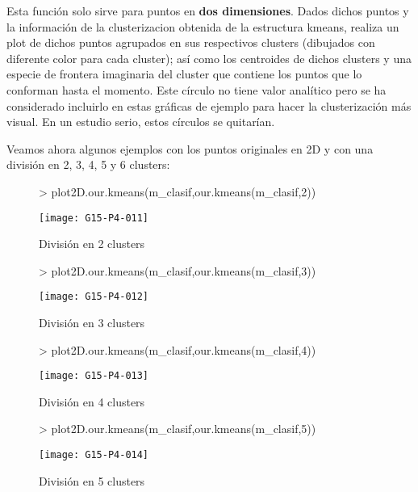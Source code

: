 \documentclass [a4paper] {article}
\begin{document}
Esta función solo sirve para puntos en \textbf{dos dimensiones}. Dados dichos puntos y la información de la clusterizacion obtenida de la estructura kmeans, realiza un plot de dichos puntos agrupados en sus respectivos clusters (dibujados con diferente color para cada cluster); así como los centroides de dichos clusters y una especie de frontera imaginaria del cluster que contiene los puntos que lo conforman hasta el momento. Este círculo no tiene valor analítico pero se ha considerado incluirlo en estas gráficas de ejemplo para hacer la clusterización más visual. En un estudio serio, estos círculos se quitarían.

Veamos ahora algunos ejemplos con los puntos originales en 2D y con una división en 2, 3, 4, 5 y 6 clusters:
\begin{figure}[htbp!]
\centering
\begin{Schunk}
\begin{Sinput}
> plot2D.our.kmeans(m_clasif,our.kmeans(m_clasif,2))
\end{Sinput}
\end{Schunk}
\texttt{[image: G15-P4-011]}
\caption{División en 2 clusters}
\end{figure}

\begin{figure}[htbp!]
\centering
\begin{Schunk}
\begin{Sinput}
> plot2D.our.kmeans(m_clasif,our.kmeans(m_clasif,3))
\end{Sinput}
\end{Schunk}
\texttt{[image: G15-P4-012]}
\caption{División en 3 clusters}
\end{figure}

\begin{figure}[htbp!]
\centering
\begin{Schunk}
\begin{Sinput}
> plot2D.our.kmeans(m_clasif,our.kmeans(m_clasif,4))
\end{Sinput}
\end{Schunk}
\texttt{[image: G15-P4-013]}
\caption{División en 4 clusters}
\end{figure}

\begin{figure}[htbp!]
\centering
\begin{Schunk}
\begin{Sinput}
> plot2D.our.kmeans(m_clasif,our.kmeans(m_clasif,5))
\end{Sinput}
\end{Schunk}
\texttt{[image: G15-P4-014]}
\caption{División en 5 clusters}
\end{figure}
\end{document}
